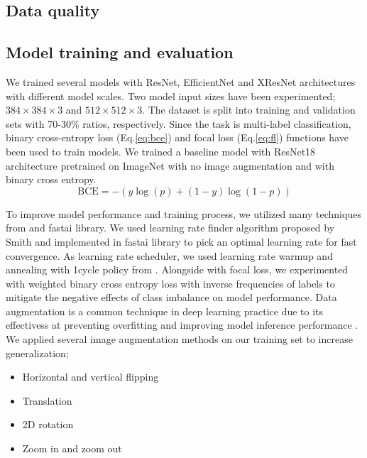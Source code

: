 \documentclass[conference]{IEEEtran}
\begin{document}
\subsection{Data quality}

\subsection{Model training and evaluation}
We trained several models with ResNet, EfficientNet and XResNet architectures 
with different model scales. Two model input sizes have been experimented; 
$384 \times 384 \times 3$ and $512 \times 512 \times 3$. 
The dataset is split into training and validation sets with 70-30\% ratios, respectively.
Since the task is multi-label classification, binary cross-entropy loss (Eq.\ref{eq:bce})
and focal loss (Eq.\ref{eq:fl}) functions have been used to train models. 
We trained a baseline model with ResNet18 architecture pretrained on ImageNet 
with no image augmentation and with binary cross entropy. 
\begin{equation*}
    \text{BCE} = -{(y\log(p) + (1 - y)\log(1 - p))} \label{eq:bce}
\end{equation*}

To improve model performance and training process, 
we utilized many techniques from \cite{BagOfTricks} and fastai \cite{fastai} library.
We used learning rate finder algorithm proposed by Smith \cite{Smith2015}
and implemented in fastai library to pick an optimal learning rate for fast convergence.
As learning rate scheduler, we used learning rate warmup and annealing \cite{BagOfTricks}
with 1cycle policy from \cite{Smith2018}. Alongside with focal loss, 
we experimented with weighted binary cross entropy loss with inverse 
frequencies of labels to mitigate the negative effects of class imbalance 
on model performance. 
Data augmentation is a common technique in deep learning practice due to its 
effectivess at preventing overfitting and improving model inference performance \cite{Shorten2019}.
We applied several image augmentation methods on our training set 
to increase generalization;
\begin{itemize}
    \item Horizontal and vertical flipping
    \item Translation
    \item 2D rotation
    \item Zoom in and zoom out
\end{itemize}
\end{document}
